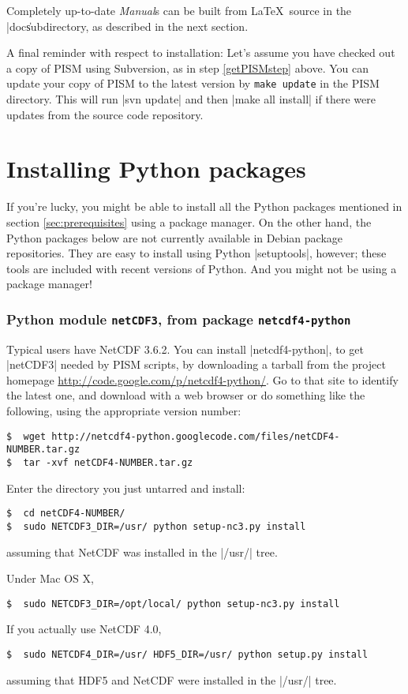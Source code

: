 \documentclass[11pt,final]{amsart}
\begin{document}
Completely up-to-date \emph{Manual}s can be built from \LaTeX~source in the |doc\| subdirectory, as described in the next section.

A final reminder with respect to installation: Let's assume you have checked out a copy of PISM using Subversion, as in step \ref{getPISMstep} above.  You can update your copy of PISM to the latest version by \verb|make update| in the PISM directory.  This will run |svn update| and then |make all install| if there were updates from the source code repository.


\newpage
\section{Installing Python packages}
\label{sec:python}

If you're lucky, you might be able to install all the Python packages mentioned in section \ref{sec:prerequisites} using a package manager. On the other hand, the Python packages below are not currently available in Debian package repositories. They are easy to install using Python |setuptools|, however; these tools are included with recent versions of Python.  And you might not be using a package manager!

\subsubsection*{Python module \texttt{netCDF3}, from package \texttt{netcdf4-python}}  Typical users have NetCDF 3.6.2.  You can install |netcdf4-python|, to get |netCDF3| needed by PISM scripts, by downloading a tarball from the project homepage \url{http://code.google.com/p/netcdf4-python/}.  Go to that site to identify the latest one, and download with a web browser or do something like the following, using the appropriate version number:
\begin{verbatim}
$  wget http://netcdf4-python.googlecode.com/files/netCDF4-NUMBER.tar.gz
$  tar -xvf netCDF4-NUMBER.tar.gz
\end{verbatim}
Enter the directory you just untarred and install:
\begin{verbatim}
$  cd netCDF4-NUMBER/
$  sudo NETCDF3_DIR=/usr/ python setup-nc3.py install
\end{verbatim}
assuming that NetCDF was installed in the |/usr/| tree.

Under Mac OS X,
\begin{verbatim}
$  sudo NETCDF3_DIR=/opt/local/ python setup-nc3.py install
\end{verbatim}
If you actually use NetCDF 4.0,
\begin{verbatim}
$  sudo NETCDF4_DIR=/usr/ HDF5_DIR=/usr/ python setup.py install
\end{verbatim}
assuming that HDF5 and NetCDF were installed in the |/usr/| tree.
\end{document}
